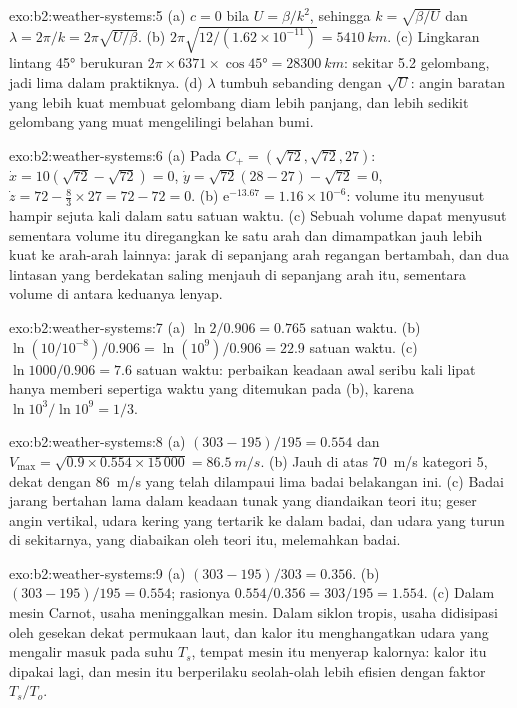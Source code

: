\begin{solution}{exo:b2:weather-systems:5}
(a) $c = 0$ bila $U = \beta/k^2$, sehingga $k = \sqrt{\beta/U}$ dan $\lambda = 2\pi/k =
2\pi\sqrt{U/\beta}$. (b) $2\pi\sqrt{12/(1.62 \times 10^{-11})} = \qty{5410}{km}$. (c) Lingkaran
lintang \ang{45} berukuran $2\pi \times 6371 \times \cos\ang{45} = \qty{28300}{km}$: sekitar 5.2
gelombang, jadi lima dalam praktiknya. (d) $\lambda$ tumbuh sebanding dengan $\sqrt U$: angin baratan yang lebih kuat membuat
gelombang diam lebih panjang, dan lebih sedikit gelombang yang muat mengelilingi belahan bumi.
\end{solution}

\begin{solution}{exo:b2:weather-systems:6}
(a) Pada $C_+ = (\sqrt{72}, \sqrt{72}, 27)$: $\dot x = 10(\sqrt{72} - \sqrt{72}) = 0$, $\dot y =
\sqrt{72}(28 - 27) - \sqrt{72} = 0$, $\dot z = 72 - \tfrac83 \times 27 = 72 - 72 = 0$.
(b) $\mathrm{e}^{-13.67} = 1.16 \times 10^{-6}$: volume itu menyusut hampir sejuta kali dalam satu
satuan waktu. (c) Sebuah volume dapat menyusut sementara volume itu diregangkan ke satu arah dan dimampatkan jauh lebih
kuat ke arah-arah lainnya: jarak di sepanjang arah regangan bertambah, dan dua lintasan yang berdekatan
saling menjauh di sepanjang arah itu, sementara volume di antara keduanya lenyap.
\end{solution}

\begin{solution}{exo:b2:weather-systems:7}
(a) $\ln 2/0.906 = 0.765$ satuan waktu. (b) $\ln(10/10^{-8})/0.906 = \ln(10^9)/0.906 = 22.9$ satuan
waktu. (c) $\ln 1000/0.906 = 7.6$ satuan waktu: perbaikan keadaan awal seribu kali lipat
hanya memberi sepertiga waktu yang ditemukan pada (b), karena $\ln 10^3/\ln 10^9 = 1/3$.
\end{solution}

\begin{solution}{exo:b2:weather-systems:8}
(a) $(303 - 195)/195 = 0.554$ dan $V_{\max} = \sqrt{0.9 \times 0.554 \times 15\,000} =
\qty{86.5}{m/s}$. (b) Jauh di atas \qty{70}{m/s} kategori 5, dekat dengan \qty{86}{m/s} yang
telah dilampaui lima badai belakangan ini. (c) Badai jarang bertahan lama dalam keadaan tunak yang diandaikan
teori itu; geser angin vertikal, udara kering yang tertarik ke dalam badai, dan udara yang turun di sekitarnya, yang
diabaikan oleh teori itu, melemahkan badai.
\end{solution}

\begin{solution}{exo:b2:weather-systems:9}
(a) $(303 - 195)/303 = 0.356$. (b) $(303 - 195)/195 = 0.554$; rasionya $0.554/0.356 =
303/195 = 1.554$. (c) Dalam mesin Carnot, usaha meninggalkan mesin. Dalam siklon tropis,
usaha didisipasi oleh gesekan dekat permukaan laut, dan kalor itu menghangatkan udara yang mengalir masuk pada
suhu $T_s$, tempat mesin itu menyerap kalornya: kalor itu dipakai lagi, dan mesin itu berperilaku
seolah-olah lebih efisien dengan faktor $T_s/T_o$.
\end{solution}

